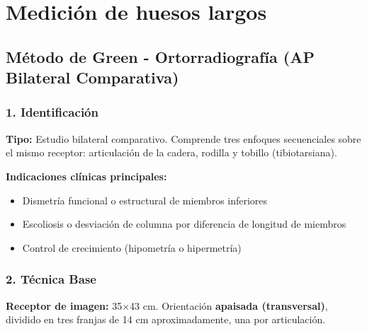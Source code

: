 	\twocolumn
	\clearpage
	
	
	\section{Medición de huesos largos}
	
	\subsection{Método de Green - Ortorradiografía (AP Bilateral Comparativa)}
	
	\subsubsection*{1. Identificación}
	
	\textbf{Tipo:} Estudio bilateral comparativo. Comprende tres enfoques secuenciales sobre el mismo receptor: articulación de la cadera, rodilla y tobillo (tibiotarsiana).
	
	\textbf{Indicaciones clínicas principales:}
	\begin{itemize}
		\item Dismetría funcional o estructural de miembros inferiores
		\item Escoliosis o desviación de columna por diferencia de longitud de miembros
		\item Control de crecimiento (hipometría o hipermetría)
	\end{itemize}
	
	\subsubsection*{2. Técnica Base}
	
	\textbf{Receptor de imagen:} 35$\times$43 cm. Orientación \textbf{apaisada (transversal)}, dividido en tres franjas de 14 cm aproximadamente, una por articulación.
	
